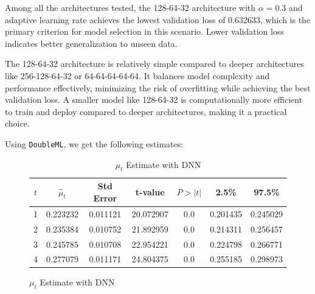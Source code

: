 \documentclass{article}
\begin{document}
Among all the architectures tested, the 128-64-32 architecture with $\alpha = 0.3$ and adaptive learning rate achieves the lowest validation loss of 0.632633, which is the primary criterion for model selection in this scenario. Lower validation loss indicates better generalization to unseen data.

The 128-64-32 architecture is relatively simple compared to deeper architectures like 256-128-64-32 or 64-64-64-64-64. It balances model complexity and performance effectively, minimizing the risk of overfitting while achieving the best validation loss. A smaller model like 128-64-32 is computationally more efficient to train and deploy compared to deeper architectures, making it a practical choice.


Using \texttt{DoubleML}, we get the following estimates:

\begin{figure}[H]
  \begin{table}[H]
  \centering
  \begin{tabular}{|ccccccc|}
    \hline
    $t$ & $\hat{\mu}_t$	& Std Error &	t-value	& $P>|t|$	& 2.5\%	& 97.5\% \\
    \hline
    1	& 0.223232 & 0.011121	& 20.072907	& 0.0 &	0.201435 & 0.245029 \\
    2	& 0.235384 & 0.010752	& 21.892959	& 0.0 &	0.214311 & 0.256457 \\
    3	& 0.245785 & 0.010708	& 22.954221	& 0.0 &	0.224798 & 0.266771 \\
    4	& 0.277079 & 0.011171	& 24.804375	& 0.0 &	0.255185 & 0.298973 \\
    \hline
  \end{tabular}
  \caption{$\mu_t$ Estimate with DNN}
\end{table}
\end{figure}
\end{document}
